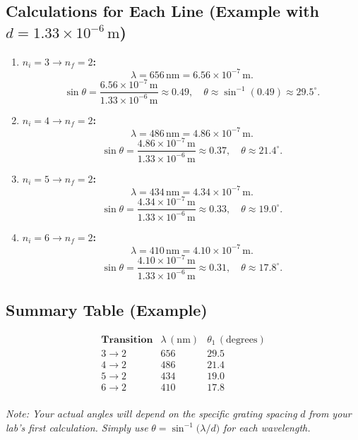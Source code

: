 \documentclass[12pt]{article}
\theoremstyle{definition} %
\theoremstyle{plain} %
\begin{document}
\subsection*{Calculations for Each Line (Example with $d = 1.33\times10^{-6}\,\text{m}$)}
\begin{enumerate}
  \item \textbf{$n_i=3 \to n_f=2$:} 
    \[
      \lambda = 656\,\text{nm} = 6.56\times10^{-7}\,\text{m}.
    \]
    \[
      \sin\theta = \frac{6.56\times10^{-7}\,\text{m}}{1.33\times10^{-6}\,\text{m}}
      \approx 0.49,
      \quad
      \theta \approx \sin^{-1}(0.49) \approx 29.5^\circ.
    \]

  \item \textbf{$n_i=4 \to n_f=2$:} 
    \[
      \lambda = 486\,\text{nm} = 4.86\times10^{-7}\,\text{m}.
    \]
    \[
      \sin\theta = \frac{4.86\times10^{-7}\,\text{m}}{1.33\times10^{-6}\,\text{m}}
      \approx 0.37,
      \quad
      \theta \approx 21.4^\circ.
    \]

  \item \textbf{$n_i=5 \to n_f=2$:} 
    \[
      \lambda = 434\,\text{nm} = 4.34\times10^{-7}\,\text{m}.
    \]
    \[
      \sin\theta = \frac{4.34\times10^{-7}\,\text{m}}{1.33\times10^{-6}\,\text{m}}
      \approx 0.33,
      \quad
      \theta \approx 19.0^\circ.
    \]

  \item \textbf{$n_i=6 \to n_f=2$:} 
    \[
      \lambda = 410\,\text{nm} = 4.10\times10^{-7}\,\text{m}.
    \]
    \[
      \sin\theta = \frac{4.10\times10^{-7}\,\text{m}}{1.33\times10^{-6}\,\text{m}}
      \approx 0.31,
      \quad
      \theta \approx 17.8^\circ.
    \]
\end{enumerate}

\subsection*{Summary Table (Example)}
\[
\begin{array}{c|c|c}
\textbf{Transition} & \lambda \,(\text{nm}) & \theta_1 \,(\text{degrees}) \\
\hline
3 \to 2 & 656 & 29.5 \\
4 \to 2 & 486 & 21.4 \\
5 \to 2 & 434 & 19.0 \\
6 \to 2 & 410 & 17.8 \\
\end{array}
\]

\noindent
\textit{Note: Your actual angles will depend on the specific grating spacing }$d$\textit{ 
from your lab's first calculation. Simply use }$\theta = \sin^{-1}\!\bigl(\lambda/d\bigr)$\textit{ 
for each wavelength.}
\end{document}
